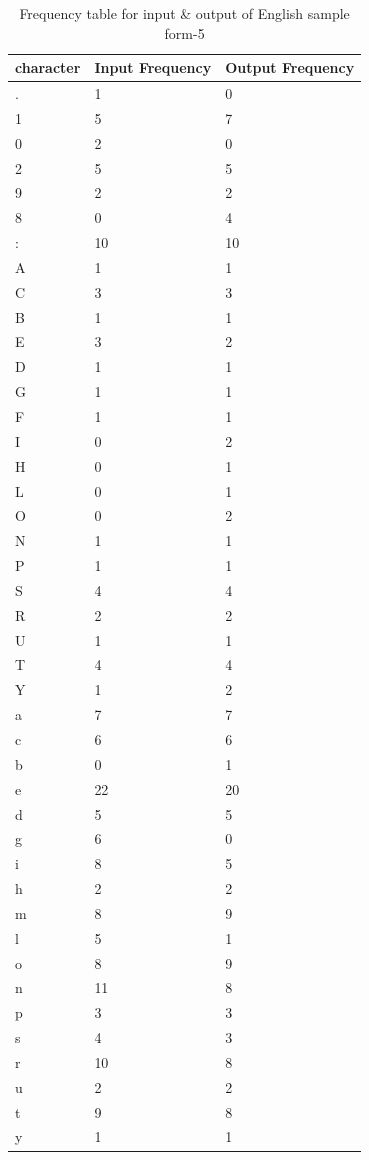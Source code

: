 \begin{table}[H]
\centering
\begin{tabular}{|p{2cm}|p{2cm}|p{2cm}|}
\hline
character & Input Frequency & Output Frequency \\
\hline
. & 1 & 0\\
\hline
1 & 5 & 7\\
\hline
0 & 2 & 0\\
\hline
2 & 5 & 5\\
\hline
9 & 2 & 2\\
\hline
8 & 0 & 4\\
\hline
: & 10 & 10\\
\hline
A & 1 & 1\\
\hline
C & 3 & 3\\
\hline
B & 1 & 1\\
\hline
E & 3 & 2\\
\hline
D & 1 & 1\\
\hline
G & 1 & 1\\
\hline
F & 1 & 1\\
\hline
I & 0 & 2\\
\hline
H & 0 & 1\\
\hline
L & 0 & 1\\
\hline
O & 0 & 2\\
\hline
N & 1 & 1\\
\hline
P & 1 & 1\\
\hline
S & 4 & 4\\
\hline
R & 2 & 2\\
\hline
U & 1 & 1\\
\hline
T & 4 & 4\\
\hline
Y & 1 & 2\\
\hline
a & 7 & 7\\
\hline
c & 6 & 6\\
\hline
b & 0 & 1\\
\hline
e & 22 & 20\\
\hline
d & 5 & 5\\
\hline
g & 6 & 0\\
\hline
i & 8 & 5\\
\hline
h & 2 & 2\\
\hline
m & 8 & 9\\
\hline
l & 5 & 1\\
\hline
o & 8 & 9\\
\hline
n & 11 & 8\\
\hline
p & 3 & 3\\
\hline
s & 4 & 3\\
\hline
r & 10 & 8\\
\hline
u & 2 & 2\\
\hline
t & 9 & 8\\
\hline
y & 1 & 1\\
\hline
\end{tabular}
\caption {Frequency table for input \& output of English sample form-5}
\label {tab:Table5}
\end{table}

